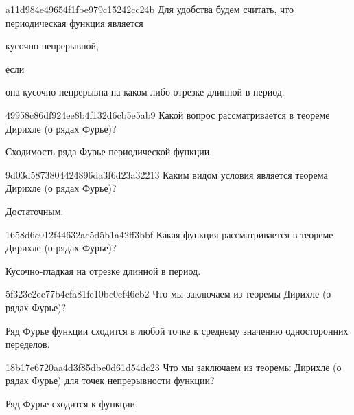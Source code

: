 \begin{note}{a11d984e49654f1fbe979c15242cc24b}
    Для удобства будем считать, что периодическая функция является \begin{icloze}{2}кусочно-не\-пре\-рыв\-ной,\end{icloze} если \begin{icloze}{1}она кусочно-не\-пре\-рыв\-на на каком-либо отрезке длинной в период.\end{icloze}
\end{note}

\begin{note}{49958c86df924ee8b4f132d6cb5e5ab9}
    Какой вопрос рассматривается в теореме Дирихле (о рядах Фурье)?

    \begin{cloze}{1}
        Сходимость ряда Фурье периодической функции.
    \end{cloze}
\end{note}

\begin{note}{9d03d5873804424896da3f6d23a32213}
    Каким видом условия является теорема Дирихле (о рядах Фурье)?

    \begin{cloze}{1}
        Достаточным.
    \end{cloze}
\end{note}

\begin{note}{1658d6c012f44632ac5d5b1a42ff3bbf}
    Какая функция рассматривается в теореме Дирихле (о рядах Фурье)?

    \begin{cloze}{1}
        Кусочно-гладкая на отрезке длинной в период.
    \end{cloze}
\end{note}

\begin{note}{5f323e2ec77b4cfa81fe10bc0ef46eb2}
    Что мы заключаем из теоремы Дирихле (о рядах Фурье)?

    \begin{cloze}{1}
        Ряд Фурье функции сходится в любой точке к среднему значению односторонних переделов.
    \end{cloze}
\end{note}

\begin{note}{18b17e6720aa4d3f85dbe0d61d54dc23}
    Что мы заключаем из теоремы Дирихле (о рядах Фурье) для точек непрерывности функции?

    \begin{cloze}{1}
        Ряд Фурье сходится к функции.
    \end{cloze}
\end{note}

